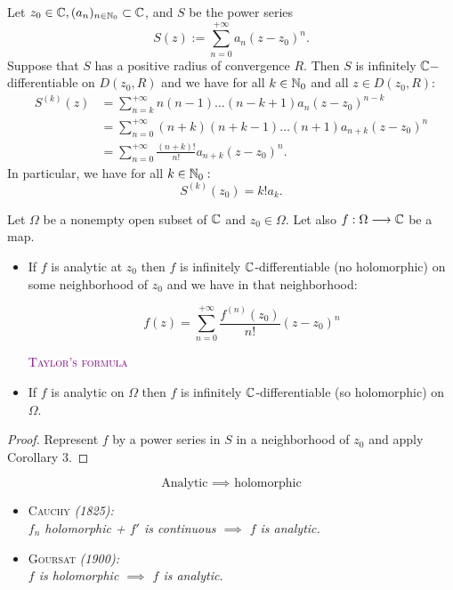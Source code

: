 \begin{corollary}
Let $z_0 \in  \mathbb{C}, (a_n ) _{n \in  \mathbb{N}_0} \subset \mathbb{C}  $, and $S $ be the power series
\[
S(z) := 
\sum_{n=0}^{+\infty} a_n (z-z_0) ^n .
\]
Suppose that $S $ has a positive radius of convergence $R $. Then $S $ is infinitely $\mathbb{C} - $differentiable  on
$D(z_0, R)  $ and we have for all $k \in  \mathbb{N}_0 $ and all $z \in  D(z_0, R)$: 
\begin{align*}
  S^{(k) }(z)  &= 
\sum_{n=k}^{+\infty } 
n(n-1) \hdots (n - k +1) a _n (z-z_0) ^{n-k} \\
& = \sum_{n=0}^{+\infty} (n+k) (n+k-1)  \hdots (n+1)  a_{n+k}(z-z_0) ^n \\
& = \sum_{n=0}^{+\infty} \frac{(n+k) !}{n!}a_{n+k}(z-z_0) ^n.
\end{align*}
In particular, we have for all $k \in  \mathbb{N}_0: $ 
\[
  S^{(k) }(z_0)  = k!a_k .
\]
\end{corollary}
\begin{corollary}
  Let $\Omega $ be a nonempty open subset of $\mathbb{C}  $ and $z_0 \in  \Omega $. Let also
  $ f : \Omega \longrightarrow \mathbb{C}  $ be a map.
  \begin{itemize}
    \item [\ding{172} ] If $f $ is analytic at $z_0 $ then $f $ is infinitely $\mathbb{C}  $-differentiable 
      (no holomorphic) on some neighborhood of $z_0$ and we have in that neighborhood:
      \begin{center}
      \begin{tcolorbox}[boxrule=1pt, colback=larratBicep!60, sharp corners, width=6cm, height=2cm, top=-0.1cm]
      \[
      f(z)  = \sum_{n=0}^{+\infty} \frac{f^{(n) }(z_0) }{n!}(z-z_0) ^n 
      \]
      \end{tcolorbox}
      \textcolor{purple}{\textsc{Taylor's formula}}
      \end{center}
    \item [\ding{173} ] If $f$  is analytic on $\Omega $ then $f $ is infinitely $\mathbb{C}  $-differentiable 
      (so holomorphic) on $\Omega $.
  \end{itemize}
\end{corollary}
\begin{proof}
  Represent $f $ by a power series in $S $ in a neighborhood of $z_0 $ and apply Corollary 3.
\end{proof}
\begin{remark}
  \[
    \text{Analytic }  \implies \text{ holomorphic}  
  \]
  \begin{itemize}
    \item [\ding{173} ] \textsc{Cauchy }\it (1825):\normalfont\\
      $f_n$ holomorphic + $f' $ is continuous $ \implies  $ $f $ is analytic. 
    \item [\ding{174} ] \textsc{Goursat }\it (1900):\normalfont\\
      $f $ is holomorphic $ \implies  $ $f $ is analytic.
  \end{itemize}
\end{remark}
